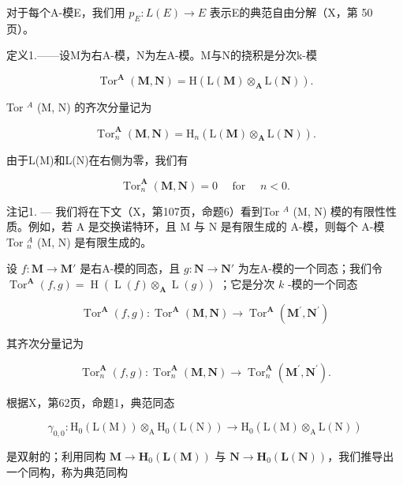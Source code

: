 对于每个A-模E，我们用 \(p_{E}: L(E) \to E\) 表示E的典范自由分解（X，第 50 页）。

定义1.——设M为右A-模，N为左A-模。M与N的挠积是分次k-模

\[
\operatorname{Tor} ^ {\mathbf {A}} (\mathbf {M}, \mathbf {N}) = \mathrm{H} (\mathrm{L} (\mathbf {M}) \otimes_ {\mathbf {A}} \mathrm{L} (\mathbf {N}))  .\tag{4}
\]

Tor \(^{A}\) (M, N) 的齐次分量记为

\[
\operatorname{Tor} _ {n} ^ {\mathbf {A}} (\mathbf {M}, \mathbf {N}) = \mathrm{H} _ {n} (\mathrm{L} (\mathbf {M}) \otimes_ {\mathbf {A}} \mathrm{L} (\mathbf {N})).\tag{5}
\]

由于L(M)和L(N)在右侧为零，我们有

\[
\operatorname{Tor} _ {n} ^ {\mathbf {A}} (\mathbf {M}, \mathbf {N}) = 0 \quad \text { for } \quad n <   0.\tag{6}
\]

注记1. --- 我们将在下文（X，第107页，命题6）看到Tor \(^{A}\) (M, N) 模的有限性性质。例如，若 A 是交换诺特环，且 M 与 N 是有限生成的 A-模，则每个 A-模 Tor \(_{n}^{A}\) (M, N) 是有限生成的。

设 \(f: \mathbf{M} \to \mathbf{M}'\) 是右A-模的同态，且 \(g: \mathbf{N} \to \mathbf{N}'\) 为左A-模的一个同态；我们令 \(\operatorname{Tor}^{\mathbf{A}}(f, g) = \operatorname{H}\left(\operatorname{L}(f) \otimes_{\mathbf{A}} \operatorname{L}(g)\right)\) ；它是分次 \(k\) -模的一个同态

\[
\operatorname{Tor} ^ {\mathbf {A}} (f, g): \operatorname{Tor} ^ {\mathbf {A}} (\mathbf {M}, \mathbf {N}) \rightarrow \operatorname{Tor} ^ {\mathbf {A}} (\mathbf {M} ^ {\prime}, \mathbf {N} ^ {\prime})
\]

其齐次分量记为

\[
\operatorname{Tor} _ {n} ^ {\mathbf {A}} (f, g): \operatorname{Tor} _ {n} ^ {\mathbf {A}} (\mathbf {M}, \mathbf {N}) \rightarrow \operatorname{Tor} _ {n} ^ {\mathbf {A}} (\mathbf {M} ^ {\prime}, \mathbf {N} ^ {\prime}).
\]

根据X，第62页，命题1，典范同态

\[
\gamma_ {0, 0}: \mathrm{H} _ {0} (\mathrm{L} (\mathrm{M})) \otimes_ {\mathrm{A}} \mathrm{H} _ {0} (\mathrm{L} (\mathrm{N})) \rightarrow \mathrm{H} _ {0} (\mathrm{L} (\mathrm{M}) \otimes_ {\mathrm{A}} \mathrm{L} (\mathrm{N}))
\]

是双射的；利用同构 \(\mathbf{M} \to \mathbf{H}_{0}(\mathbf{L}(\mathbf{M}))\) 与 \(\mathbf{N} \to \mathbf{H}_{0}(\mathbf{L}(\mathbf{N}))\)，我们推导出一个同构，称为典范同构

